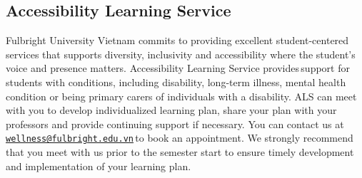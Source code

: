 \documentclass[
]{article}
\begin{document}
\hypertarget{accessibility-learning-service}{%
\subsection*{Accessibility Learning Service}\label{accessibility-learning-service}}

Fulbright University Vietnam commits to providing excellent student-centered services that supports diversity, inclusivity and accessibility where the student's voice and presence matters. Accessibility Learning Service provides\,support for students with conditions, including disability, long-term illness, mental health condition or being primary carers of individuals with a disability. ALS can meet with you to develop individualized learning plan, share your plan with your professors and provide continuing support if necessary. You can contact us at\,\href{mailto:wellness@fulbright.edu.vn}{\nolinkurl{wellness@fulbright.edu.vn}}\,to book an appointment. We strongly recommend that you meet with us prior to the semester start to ensure timely development and implementation of your learning plan.
\end{document}
